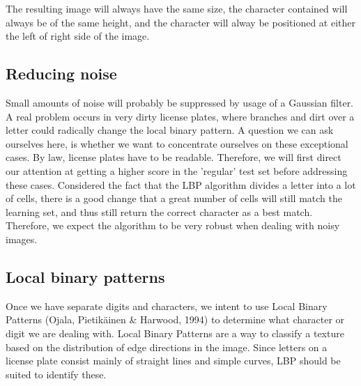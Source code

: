 \documentclass[a4paper]{article}
\begin{document}
The resulting image will always have the same size, the character contained
will always be of the same height, and the character will alway be positioned
at either the left of right side of the image.

\subsection{Reducing noise}

Small amounts of noise will probably be suppressed by usage of a Gaussian
filter. A real problem occurs in very dirty license plates, where branches and
dirt over a letter could radically change the local binary pattern. A question
we can ask ourselves here, is whether we want to concentrate ourselves on these
exceptional cases. By law, license plates have to be readable. Therefore, we
will first direct our attention at getting a higher score in the 'regular' test
set before addressing these cases. Considered the fact that the LBP algorithm
divides a letter into a lot of cells, there is a good change that a great
number of cells will still match the learning set, and thus still return the
correct character as a best match. Therefore, we expect the algorithm to be
very robust when dealing with noisy images.

\subsection{Local binary patterns}
Once we have separate digits and characters, we intent to use Local Binary
Patterns (Ojala, Pietikäinen \& Harwood, 1994) to determine what character
or digit we are dealing with. Local Binary
Patterns are a way to classify a texture based on the distribution of edge
directions in the image. Since letters on a license plate consist mainly of
straight lines and simple curves, LBP should be suited to identify these.
\end{document}
